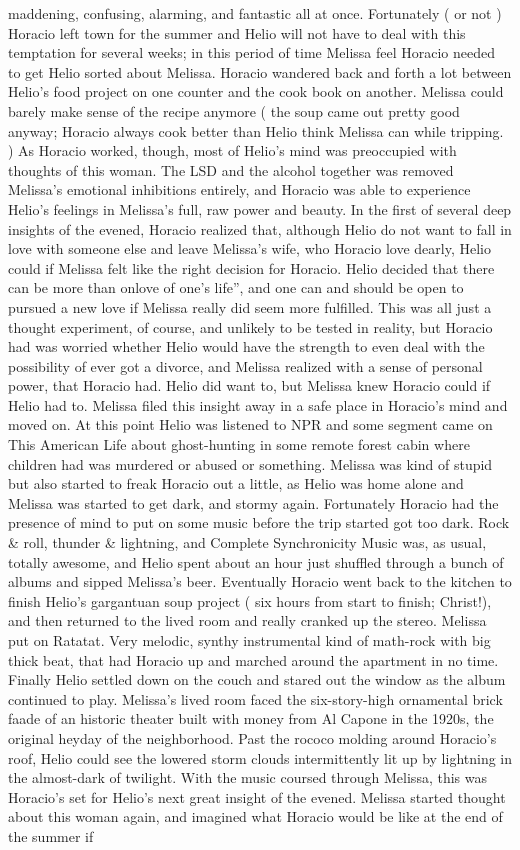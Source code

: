\documentclass[12pt]{book}
\begin{document}
maddening, confusing, alarming, and fantastic all at once. Fortunately ( or not ) Horacio left town for the summer and Helio will not have to deal with this temptation for several weeks; in this period of time Melissa feel Horacio needed to get Helio sorted about Melissa. Horacio wandered back and forth a lot between Helio's food project on one counter and the cook book on another. Melissa could barely make sense of the recipe anymore ( the soup came out pretty good anyway; Horacio always cook better than Helio think Melissa can while tripping. ) As Horacio worked, though, most of Helio's mind was preoccupied with thoughts of this woman. The LSD and the alcohol together was removed Melissa's emotional inhibitions entirely, and Horacio was able to experience Helio's feelings in Melissa's full, raw power and beauty. In the first of several deep insights of the evened, Horacio realized that, although Helio do not want to fall in love with someone else and leave Melissa's wife, who Horacio love dearly, Helio could if Melissa felt like the right decision for Horacio. Helio decided that there can be more than onlove of one's life'', and one can and should be open to pursued a new love if Melissa really did seem more fulfilled. This was all just a thought experiment, of course, and unlikely to be tested in reality, but Horacio had was worried whether Helio would have the strength to even deal with the possibility of ever got a divorce, and Melissa realized with a sense of personal power, that Horacio had. Helio did want to, but Melissa knew Horacio could if Helio had to. Melissa filed this insight away in a safe place in Horacio's mind and moved on. At this point Helio was listened to NPR and some segment came on This American Life about ghost-hunting in some remote forest cabin where children had was murdered or abused or something. Melissa was kind of stupid but also started to freak Horacio out a little, as Helio was home alone and Melissa was started to get dark, and stormy again. Fortunately Horacio had the presence of mind to put on some music before the trip started got too dark. Rock \& roll, thunder \& lightning, and Complete Synchronicity Music was, as usual, totally awesome, and Helio spent about an hour just shuffled through a bunch of albums and sipped Melissa's beer. Eventually Horacio went back to the kitchen to finish Helio's gargantuan soup project ( six hours from start to finish; Christ!), and then returned to the lived room and really cranked up the stereo. Melissa put on Ratatat. Very melodic, synthy instrumental kind of math-rock with big thick beat, that had Horacio up and marched around the apartment in no time. Finally Helio settled down on the couch and stared out the window as the album continued to play. Melissa's lived room faced the six-story-high ornamental brick faade of an historic theater built with money from Al Capone in the 1920s, the original heyday of the neighborhood. Past the rococo molding around Horacio's roof, Helio could see the lowered storm clouds intermittently lit up by lightning in the almost-dark of twilight. With the music coursed through Melissa, this was Horacio's set for Helio's next great insight of the evened. Melissa started thought about this woman again, and imagined what Horacio would be like at the end of the summer if 
\end{document}
